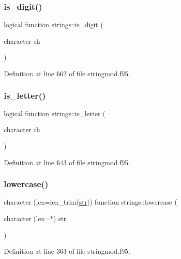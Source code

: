\subsubsection{\texorpdfstring{is\+\_\+digit()}{is\_digit()}}
{\footnotesize\ttfamily logical function strings\+::is\+\_\+digit (\begin{DoxyParamCaption}\item[{character}]{ch }\end{DoxyParamCaption})}



Definition at line 662 of file stringmod.\+f95.

\mbox{\label{namespacestrings_a3b44a9a233716da3271b645eee79d8f0}} 
\subsubsection{\texorpdfstring{is\+\_\+letter()}{is\_letter()}}
{\footnotesize\ttfamily logical function strings\+::is\+\_\+letter (\begin{DoxyParamCaption}\item[{character}]{ch }\end{DoxyParamCaption})}



Definition at line 643 of file stringmod.\+f95.

\mbox{\label{namespacestrings_ad5a1054d696063fbd4e11ad636796226}} 
\subsubsection{\texorpdfstring{lowercase()}{lowercase()}}
{\footnotesize\ttfamily character (len=len\+\_\+trim(\hyperlink{_s_o_l_w_e_i_g__misc_8f95_a77a2ca74046c88062aa8333bf1eaca05}{str})) function strings\+::lowercase (\begin{DoxyParamCaption}\item[{character (len=$\ast$)}]{str }\end{DoxyParamCaption})}



Definition at line 363 of file stringmod.\+f95.

\mbox{\label{namespacestrings_ad5ead0bc741b619b8e30528ccebbd057}} 
